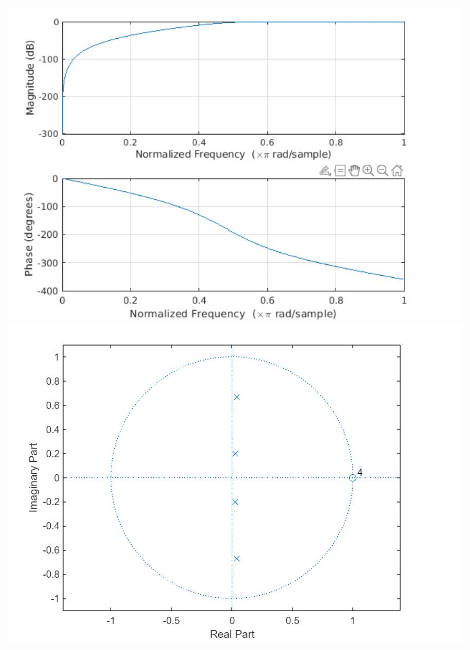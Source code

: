 \documentclass{article}
\begin{document}
\begin{enumerate}
\begin{enumerate}
	\begin{center}
    \includegraphics[width=0.9\textwidth]{A9_1_3.JPG}
    \includegraphics[width=0.9\textwidth]{A9_1_2.JPG}
    \end{center}
\end{enumerate}	
\\

\end{enumerate}
\end{document}
